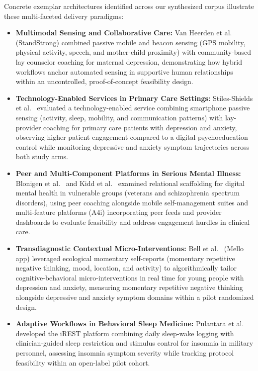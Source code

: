 Concrete exemplar architectures identified across our synthesized corpus illustrate these multi-faceted delivery paradigms:
\begin{itemize}
    \item \textbf{Multimodal Sensing and Collaborative Care:} Van Heerden et al.~\cite{vanheerden2024standstrong} (StandStrong) combined passive mobile and beacon sensing (GPS mobility, physical activity, speech, and mother-child proximity) with community-based lay counselor coaching for maternal depression, demonstrating how hybrid workflows anchor automated sensing in supportive human relationships within an uncontrolled, proof-of-concept feasibility design.
    \item \textbf{Technology-Enabled Services in Primary Care Settings:} Stiles-Shields et al.~\cite{stiles-shields2024personalsensing} evaluated a technology-enabled service combining smartphone passive sensing (activity, sleep, mobility, and communication patterns) with lay-provider coaching for primary care patients with depression and anxiety, observing higher patient engagement compared to a digital psychoeducation control while monitoring depressive and anxiety symptom trajectories across both study arms.
    \item \textbf{Peer and Multi-Component Platforms in Serious Mental Illness:} Blonigen et al.~\cite{blonigen2023peersupported} and Kidd et al.~\cite{kidd2019app4independence, kidd2025appindependence} examined relational scaffolding for digital mental health in vulnerable groups (veterans and schizophrenia spectrum disorders), using peer coaching alongside mobile self-management suites and multi-feature platforms (A4i) incorporating peer feeds and provider dashboards to evaluate feasibility and address engagement hurdles in clinical care.
    \item \textbf{Transdiagnostic Contextual Micro-Interventions:} Bell et al.~\cite{bell2023mello} (Mello app) leveraged ecological momentary self-reports (momentary repetitive negative thinking, mood, location, and activity) to algorithmically tailor cognitive-behavioral micro-interventions in real time for young people with depression and anxiety, measuring momentary repetitive negative thinking alongside depressive and anxiety symptom domains within a pilot randomized design.
    \item \textbf{Adaptive Workflows in Behavioral Sleep Medicine:} Pulantara et al.~\cite{pulantara2018irest, pulantara2018insomnia} developed the iREST platform combining daily sleep-wake logging with clinician-guided sleep restriction and stimulus control for insomnia in military personnel, assessing insomnia symptom severity while tracking protocol feasibility within an open-label pilot cohort.
\end{itemize}


